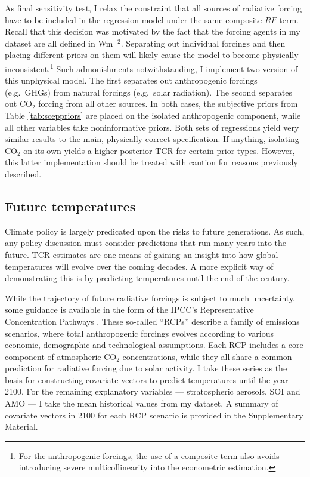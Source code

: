 \documentclass[smallextended]{svjour3}       %
\begin{document}
As final sensitivity test, I relax the constraint that all sources of
radiative forcing have to be included in the regression model under the
same composite \(RF\) term. Recall that this decision was motivated by
the fact that the forcing agents in my dataset are all defined in
Wm\(^{-2}\). Separating out individual forcings and then placing
different priors on them will likely cause the model to become
physically inconsistent.\footnote{For the anthropogenic forcings, the
  use of a composite term also avoids introducing severe
  multicollinearity into the econometric estimation.} Such admonishments
notwithstanding, I implement two version of this unphysical model. The
first separates out anthropogenic forcings (e.g.~GHGs) from natural
forcings (e.g.~solar radiation). The second separates out CO\(_2\)
forcing from all other sources. In both cases, the subjective priors
from Table \ref{tab:sceppriors} are placed on the isolated anthropogenic
component, while all other variables take noninformative priors. Both
sets of regressions yield very similar results to the main,
physically-correct specification. If anything, isolating CO\(_2\) on its
own yields a higher posterior TCR for certain prior types. However, this
latter implementation should be treated with caution for reasons
previously described.

\hypertarget{sec:future}{%
\subsection{Future temperatures}\label{sec:future}}

Climate policy is largely predicated upon the risks to future
generations. As such, any policy discussion must consider predictions
that run many years into the future. TCR estimates are one means of
gaining an insight into how global temperatures will evolve over the
coming decades. A more explicit way of demonstrating this is by
predicting temperatures until the end of the century.

While the trajectory of future radiative forcings is subject to much
uncertainty, some guidance is available in the form of the IPCC's
Representative Concentration Pathways \cite{van2011rcp}. These so-called
``RCPs'' describe a family of emissions scenarios, where total
anthropogenic forcings evolves according to various economic,
demographic and technological assumptions. Each RCP includes a core
component of atmospheric CO\(_2\) concentrations, while they all share a
common prediction for radiative forcing due to solar activity. I take
these series as the basis for constructing covariate vectors to predict
temperatures until the year 2100. For the remaining explanatory
variables --- stratospheric aerosols, SOI and AMO --- I take the mean
historical values from my dataset. A summary of covariate vectors in
2100 for each RCP scenario is provided in the Supplementary Material.
\end{document}
